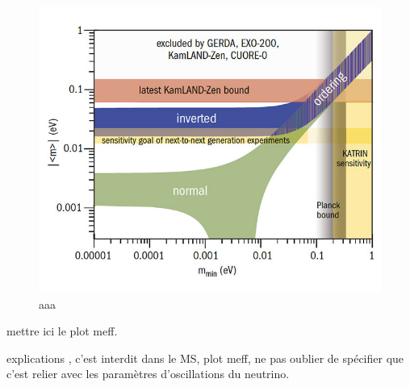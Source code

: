\documentclass[main.tex]{subfiles}
\begin{document}
\begin{figure}[h!]
\begin{center}
\includegraphics[scale=0.40]{pictures/Chap2/MeffVsMmin.jpg}
\caption{aaa}
\label{MeffVsMmin}
\end{center}
\end{figure}




\NI mettre ici le plot meff.



\NI explications , c'est interdit dans le MS, plot meff, ne pas oublier de spécifier que c'est relier avec les paramètres d'oscillations du neutrino.
\end{document}
